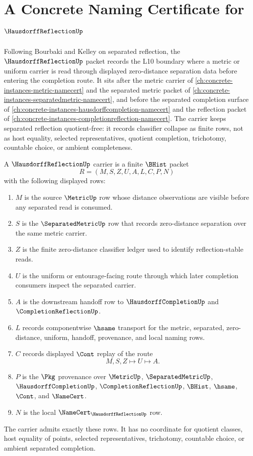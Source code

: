 \chapter{A Concrete Naming Certificate for $\HausdorffReflectionUp$}
\label{ch:concrete-instances-hausdorff-reflection-namecert}

Following Bourbaki and Kelley on separated reflection, the $\HausdorffReflectionUp$ packet records the L10 boundary where a metric or uniform carrier is read through displayed zero-distance separation data before entering the completion route. It sits after the metric carrier of \autoref{ch:concrete-instances-metric-namecert} and the separated metric packet of \autoref{ch:concrete-instances-separatedmetric-namecert}, and before the separated completion surface of \autoref{ch:concrete-instances-hausdorffcompletion-namecert} and the reflection packet of \autoref{ch:concrete-instances-completionreflection-namecert}. The carrier keeps separated reflection quotient-free: it records classifier collapse as finite rows, not as host equality, selected representatives, quotient completion, trichotomy, countable choice, or ambient completeness.

\begin{definition}
\label{def:hausdorff-reflection-carrier}
A $\HausdorffReflectionUp$ carrier is a finite $\BHist$ packet
$$
R=(M,S,Z,U,A,L,C,P,N)
$$
with the following displayed rows:
\begin{enumerate}
\item $M$ is the source $\MetricUp$ row whose distance observations are visible before any separated read is consumed.
\item $S$ is the $\SeparatedMetricUp$ row that records zero-distance separation over the same metric carrier.
\item $Z$ is the finite zero-distance classifier ledger used to identify reflection-stable reads.
\item $U$ is the uniform or entourage-facing route through which later completion consumers inspect the separated carrier.
\item $A$ is the downstream handoff row to $\HausdorffCompletionUp$ and $\CompletionReflectionUp$.
\item $L$ records componentwise $\hsame$ transport for the metric, separated, zero-distance, uniform, handoff, provenance, and local naming rows.
\item $C$ records displayed $\Cont$ replay of the route
$$
M,S,Z \longmapsto U \longmapsto A .
$$
\item $P$ is the $\Pkg$ provenance over $\MetricUp$, $\SeparatedMetricUp$, $\HausdorffCompletionUp$, $\CompletionReflectionUp$, $\BHist$, $\hsame$, $\Cont$, and $\NameCert$.
\item $N$ is the local $\NameCert_{\HausdorffReflectionUp}$ row.
\end{enumerate}
The carrier admits exactly these rows. It has no coordinate for quotient classes, host equality of points, selected representatives, trichotomy, countable choice, or ambient separated completion.
\end{definition}


